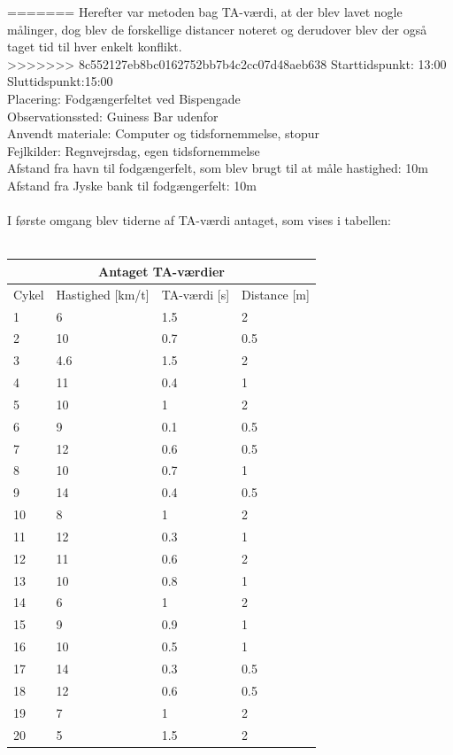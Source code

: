 =======
Herefter var metoden bag TA-værdi, at der blev lavet nogle målinger, dog blev de forskellige distancer noteret og derudover blev der også taget tid til hver enkelt konflikt.\\
>>>>>>> 8c552127eb8bc0162752bb7b4c2cc07d48aeb638
Starttidspunkt: 13:00
\\
Sluttidspunkt:15:00
\\
Placering: Fodgængerfeltet ved Bispengade
\\
Observationssted: Guiness Bar udenfor
\\
Anvendt materiale: Computer og tidsfornemmelse, stopur
\\
Fejlkilder: Regnvejrsdag, egen tidsfornemmelse
\\
Afstand fra havn til fodgængerfelt, som blev brugt til at måle hastighed: 10m
\\
Afstand fra Jyske bank til fodgængerfelt: 10m
\\\\
I første omgang blev tiderne af TA-værdi antaget, som vises i tabellen:
\\\\
\begin{tabular}{ |p{1cm}|p{4cm}|p{4cm}|p{4cm}|  }
\hline
\multicolumn{4}{|c|}{Antaget TA-værdier} \\
\hline
Cykel & Hastighed [km/t] & TA-værdi [s] & Distance [m] \\
\hline
1 & 6   & 1.5 & 2 \\
2 & 10  & 0.7 & 0.5 \\
3 & 4.6 & 1.5 & 2 \\
4 & 11  & 0.4 & 1 \\
5 & 10  & 1 & 2 \\
6 & 9   & 0.1 & 0.5 \\
7 & 12  & 0.6 & 0.5 \\
8 & 10  & 0.7 & 1 \\
9 & 14  & 0.4 & 0.5 \\
10 & 8  & 1   & 2 \\
11 & 12 &0.3  &  1 \\
12 & 11 & 0.6 &   2\\
13 & 10 & 0.8 & 1\\
14 & 6  & 1   & 2\\
15 & 9  & 0.9 & 1\\
16 & 10 & 0.5 & 1\\
17 & 14 & 0.3 &0.5\\
18 & 12 & 0.6 & 0.5\\
19 & 7  & 1 & 2\\
20 & 5  & 1.5 & 2\\
\hline
\end{tabular}




